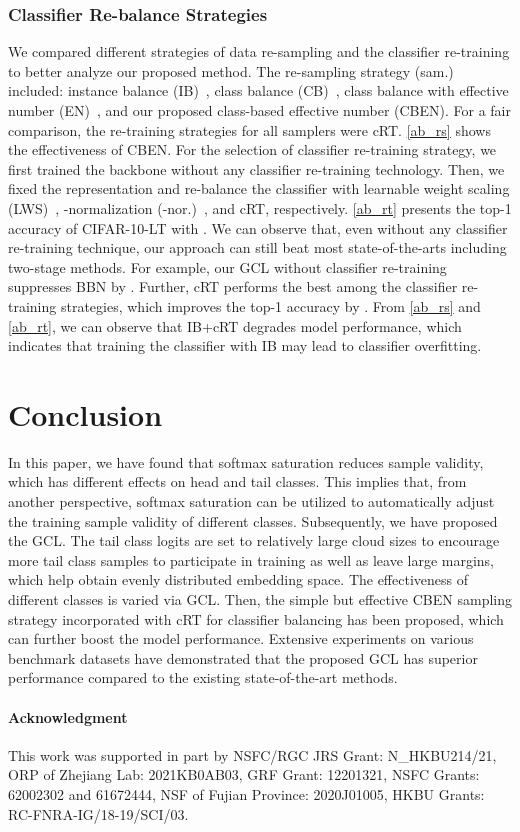 \documentclass[10pt,twocolumn,letterpaper]{article}
\begin{document}
\subsubsection{Classifier Re-balance Strategies} \label{sec:sample_strategy}
We compared different strategies of data re-sampling and the classifier re-training to better analyze our proposed method. The re-sampling strategy (sam.) included: instance balance (IB)~\cite{decouple20}, class balance (CB)~\cite{decouple20}, class balance with effective number (EN)~\cite{cui2019class}, and our proposed class-based effective number (CBEN). For a fair comparison, the re-training strategies for all samplers were cRT. \cref{ab_rs} shows the effectiveness of CBEN.
For the selection of classifier re-training strategy, we first trained the backbone without any classifier re-training technology. Then, we fixed the representation and re-balance the classifier with learnable weight scaling (LWS)~\cite{decouple20}, -normalization (-nor.)~\cite{decouple20}, and cRT, respectively. \cref{ab_rt} presents the top-1 accuracy of CIFAR-10-LT with . We can observe that, even without any classifier re-training technique, our approach can still beat most state-of-the-arts including two-stage methods. For example, our GCL without classifier re-training suppresses BBN by . Further, cRT performs the best among the classifier re-training strategies, which improves the top-1 accuracy by .   From \cref{ab_rs} and \cref{ab_rt}, we can observe that IB+cRT degrades model performance, which indicates that training the classifier with IB may lead to classifier overfitting.

\section{Conclusion}
In this paper, we have found that softmax saturation reduces sample validity, which has different effects on head and tail classes. This implies that, from another perspective, softmax saturation can be utilized to automatically adjust the training sample validity of different classes. Subsequently, we have proposed the GCL. The tail class logits are set to relatively large cloud sizes to encourage more tail class samples to participate in training as well as leave large margins, which help obtain evenly distributed embedding space. The effectiveness of different classes is varied via GCL. Then, the simple but effective CBEN sampling strategy incorporated with cRT for classifier balancing has been proposed, which can further boost the model performance. Extensive experiments on various benchmark datasets have demonstrated that the proposed GCL has superior performance compared to the existing state-of-the-art methods.

\paragraph{Acknowledgment}This work was supported in part by NSFC/RGC JRS Grant: N\_HKBU214/21, ORP of Zhejiang Lab: 2021KB0AB03, GRF Grant: 12201321, NSFC Grants: 62002302 and 61672444, NSF of Fujian Province: 2020J01005, HKBU Grants: RC-FNRA-IG/18-19/SCI/03.
\clearpage
{\small


}
\end{document}
